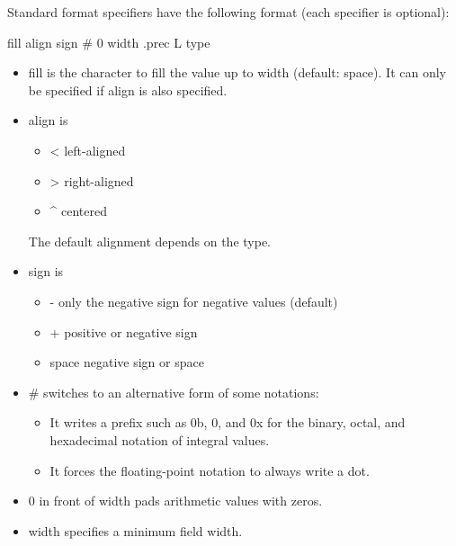 
Standard format specifiers have the following format (each specifier is optional):

\begin{shell}
fill align sign # 0 width .prec L type
\end{shell}

\begin{itemize}
\item 
fill is the character to fill the value up to width (default: space). It can only be specified if align is also specified.

\item 
align is

\begin{itemize}
\item 
< left-aligned

\item 
> right-aligned

\item 
\^{} centered
\end{itemize}

The default alignment depends on the type.

\item 
sign is

\begin{itemize}
\item 
- only the negative sign for negative values (default)

\item 
+ positive or negative sign

\item 
space negative sign or space
\end{itemize}

\item 
\# switches to an alternative form of some notations:

\begin{itemize}
\item 
It writes a prefix such as 0b, 0, and 0x for the binary, octal, and hexadecimal notation of integral values.

\item 
It forces the floating-point notation to always write a dot.
\end{itemize}

\item 
0 in front of width pads arithmetic values with zeros.

\item 
width specifies a minimum field width.


\end{itemize}
